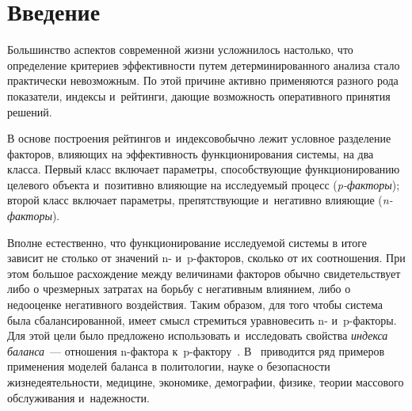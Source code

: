 
  
\vspace*{-4pt}



\thispagestyle{headings}

\begin{multicols}{2}

\label{st\stat}

\section{Введение}


Большинство аспектов современной жизни усложнилось настолько, что определение 
критериев эффективности путем детерминированного анализа стало практически 
невозможным. По этой причине активно применяются разного рода показатели, 
индексы и~рейтинги, дающие возможность оперативного принятия решений.

В основе построения рейтингов и~индексов\linebreak обычно лежит условное разделение 
факторов, влияющих на эффективность функционирования сис\-те\-мы, на два класса. 
Первый класс включает па\-ра\-мет\-ры, способствующие функционированию \mbox{целевого} 
объекта и~позитивно влия\-ющие на ис\-сле\-ду\-емый процесс (\textit{p-фак\-то\-ры}); второй 
класс включает па\-ра\-мет\-ры, препятствующие и~негативно вли\-я\-ющие (\textit{n-фак\-то\-ры}).

Вполне естественно, что функционирование исследуемой системы в итоге зависит не 
столько от значений n- и~p-фак\-то\-ров, сколько от их соотношения. При этом большое 
расхождение между величинами факторов обычно свидетельствует либо о чрезмерных 
затратах на борьбу с негативным влиянием, либо о недооценке негативного 
воздействия. Таким образом, для того чтобы система была сбалансированной, имеет 
смысл стремиться уравновесить n- и~p-фак\-то\-ры. Для этой цели было предложено 
использовать и~исследовать свойства \textit{индекса баланса}~--- 
отношения n-фак\-то\-ра к~p-фак\-то\-ру~\cite{Ku2018}. В~\cite{Ku2018,KuShe2021_1} приводится ряд 
примеров применения моделей баланса в политологии, науке о безопасности 
жизнедеятельности, медицине, экономике, демографии, физике, теории массового 
обслуживания и~надежности.


\end{multicols}
